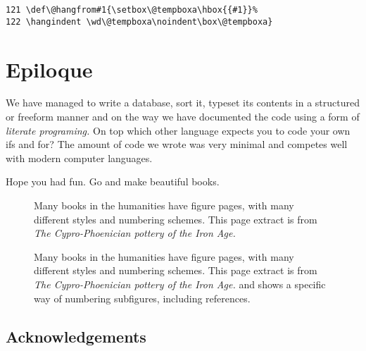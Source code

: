 \begin{verbatim}
121 \def\@hangfrom#1{\setbox\@tempboxa\hbox{{#1}}%
122 \hangindent \wd\@tempboxa\noindent\box\@tempboxa}
\end{verbatim}

\medskip




\makeatother

\section{Epiloque}

We have managed to write a database, sort it, typeset its contents in a structured or freeform manner
and on the way we have documented the code using a form of \textit{literate programing.} On top which
other language expects you to code your own ifs and for? 
The amount of code we wrote was very minimal and competes well with modern computer languages. 

Hope you had fun. Go and make beautiful books. 

\begin{figure}[htp]
\centering
{\color{thegray}
}
\caption{Many books in the humanities have figure pages, with many different styles and numbering schemes. This page extract is from \textit{The Cypro-Phoenician pottery of the Iron Age. }  \protect\cite{schreiber1971} }
\end{figure}


\begin{figure}[htp]
\centering
{\color{thegray}
}
\caption{Many books in the humanities have figure pages, with many different styles and numbering schemes. This page extract is from \textit{The Cypro-Phoenician pottery of the Iron Age. }  \cite{schreiber1971} and shows a specific way of numbering subfigures, including references.}
\end{figure}
\clearpage



 \subsection{Acknowledgements}

